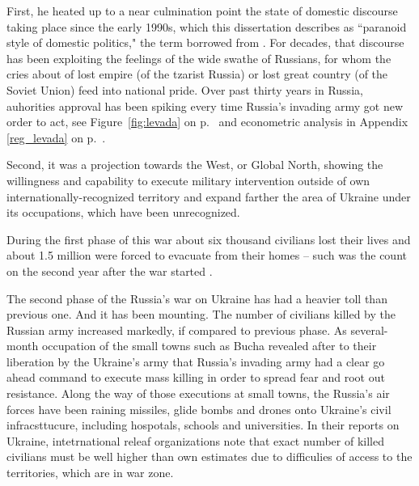 First, he heated up to a near culmination point the state of domestic discourse taking place since the early 1990s, which this dissertation describes as ``paranoid style of domestic politics," the term borrowed from \citep{hofstadter2020,dharvey}. For decades, that discourse has been exploiting the feelings of the wide swathe of Russians, for whom the cries about of lost empire (of the tzarist Russia) or lost great country (of the Soviet Union) feed into national pride. Over past thirty years in Russia, auhorities approval has been spiking every time Russia's invading army got new order to act, see Figure~\ref{fig:levada} on p.~\pageref{fig:levada} and econometric analysis in Appendix \ref{reg_levada} on p.~\pageref{reg_levada}. 

Second, it was a projection towards the West, or Global North, showing the willingness and capability to execute military intervention outside of own internationally-recognized territory and expand farther the area of Ukraine under its occupations, which have been unrecognized.

During the first phase of this war about six thousand civilians lost their lives and about 1.5 million were forced to evacuate from their homes -- such was the count on the second year after the war started \citep{poroshenko2015}. 

The second phase of the Russia's war on Ukraine has had a heavier toll than previous one. And it has been mounting. The number of civilians killed by the Russian army increased markedly, if compared to previous phase. As several-month occupation of the small towns such as Bucha revealed after to their liberation by the Ukraine's army that Russia's invading army had a clear go ahead command to execute mass killing in order to spread fear and root out resistance. Along the way of those executions at small towns, the Russia's air forces have been raining missiles, glide bombs and drones onto Ukraine's civil infracsttucure, including hospotals, schools and universities. In their reports on Ukraine, intetrnational releaf organizations note that exact number of killed civilians must be well higher than own estimates due to difficulies of access to the territories, which are in war zone.  

